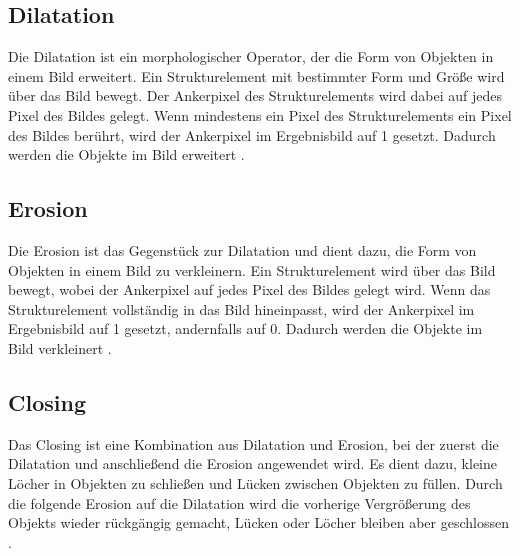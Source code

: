     \subsection{Dilatation}
    Die Dilatation ist ein morphologischer Operator, der die Form von Objekten in einem Bild erweitert. Ein Strukturelement mit bestimmter Form und Größe wird über das Bild bewegt. Der Ankerpixel des Strukturelements wird dabei auf jedes Pixel des Bildes gelegt. Wenn mindestens ein Pixel des Strukturelements ein Pixel des Bildes berührt, wird der Ankerpixel im Ergebnisbild auf 1 gesetzt. Dadurch werden die Objekte im Bild erweitert \cite[S. 14 - 16]{MorphologischeBildverarbeitung}.

    \subsection{Erosion}
    Die Erosion ist das Gegenstück zur Dilatation und dient dazu, die Form von Objekten in einem Bild zu verkleinern. Ein Strukturelement wird über das Bild bewegt, wobei der Ankerpixel auf jedes Pixel des Bildes gelegt wird. Wenn das Strukturelement vollständig in das Bild hineinpasst, wird der Ankerpixel im Ergebnisbild auf 1 gesetzt, andernfalls auf 0. Dadurch werden die Objekte im Bild verkleinert \cite[S. 13 und 14]{MorphologischeBildverarbeitung}.

    \subsection{Closing} \label{sec:closing}
    Das Closing ist eine Kombination aus Dilatation und Erosion, bei der zuerst die Dilatation und anschließend die Erosion angewendet wird. Es dient dazu, kleine Löcher in Objekten zu schließen und Lücken zwischen Objekten zu füllen. Durch die folgende Erosion auf die Dilatation wird die vorherige Vergrößerung des Objekts wieder rückgängig gemacht, Lücken oder Löcher bleiben aber geschlossen \cite[S. 18 und 19]{MorphologischeBildverarbeitung}.